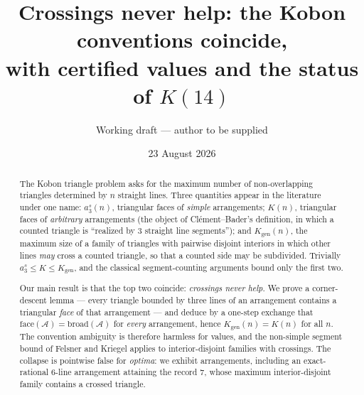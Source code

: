 \documentclass[11pt]{article}
\title{Crossings never help: the Kobon conventions coincide,\\
with certified values and the status of $K(14)$}
\author{Working draft --- author to be supplied}
\date{23 August 2026}
\theoremstyle{definition}
\newcommand{\Kgen}{K_{\mathrm{gen}}}
\begin{document}
\maketitle

\begin{abstract}
The Kobon triangle problem asks for the maximum number of non-overlapping
triangles determined by $n$ straight lines. Three quantities appear in the
literature under one name: $a_3^s(n)$, triangular faces of \emph{simple}
arrangements; $K(n)$, triangular faces of \emph{arbitrary} arrangements (the
object of Clément--Bader's definition, in which a counted triangle is
``realized by $3$ straight line segments''); and $\Kgen(n)$, the maximum size
of a family of triangles with pairwise disjoint interiors in which other
lines \emph{may} cross a counted triangle, so that a counted side may be
subdivided. Trivially $a_3^s\le K\le\Kgen$, and the classical
segment-counting arguments bound only the first two.

Our main result is that the top two coincide: \emph{crossings never help}.
We prove a corner-descent lemma --- every triangle bounded by three lines of
an arrangement contains a triangular \emph{face} of that arrangement --- and
deduce by a one-step exchange that $\mathrm{face}(\mathcal A)
=\mathrm{broad}(\mathcal A)$ for \emph{every} arrangement, hence
$\Kgen(n)=K(n)$ for all $n$. The convention ambiguity is therefore
harmless for values, and the non-simple segment bound of Felsner and Kriegel
applies to interior-disjoint families with crossings. The collapse is
pointwise false for \emph{optima}: we exhibit arrangements, including an
exact-rational $6$-line arrangement attaining the record $7$, whose maximum
interior-disjoint family contains a crossed triangle.


\end{abstract}
\end{document}
